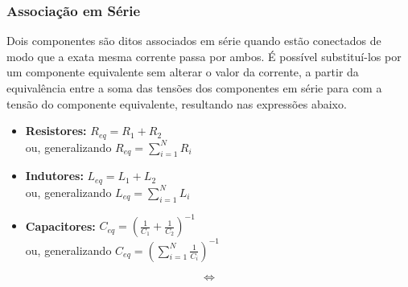\documentclass{article}
\numberwithin{equation}{section}
\newlength\Colsep
\begin{document}
\subsubsection{Associação em Série}
\label{subsubsec:serie}
Dois componentes são ditos associados em série quando estão conectados de modo que a exata mesma corrente passa por ambos. É possível substituí-los por um componente equivalente sem alterar o valor da corrente, a partir da equivalência entre a soma das tensões dos componentes em série para com a tensão do componente equivalente, resultando nas expressões abaixo.
\begin{itemize}
    \item \textbf{Resistores:} $R_{eq}= R_{1} + R_{2}$\\
    ou, generalizando $R_{eq}= \displaystyle{\sum_{i=1}^{N} R_{i}}$
    \item \textbf{Indutores:} $L_{eq}= L_{1} + L_{2}$\\
    ou, generalizando $L_{eq}= \displaystyle{\sum_{i=1}^{N} L_{i}}$
    \item \textbf{Capacitores:} $C_{eq}= \left(\displaystyle{\frac{1}{C_{1}}} + \displaystyle{\frac{1}{C_{2}}}\right)^{-1}$\\
    ou, generalizando $C_{eq}= \left(\displaystyle{\sum_{i=1}^{N} \frac{1}{C_{i}}}\right)^{-1}$
\end{itemize}

\noindent\begin{minipage}{\textwidth}
\begin{minipage}[c][2cm][c]{\dimexpr0.45\textwidth-0.5\Colsep\relax}
    \begin{center}
    \end{center}
\end{minipage} \hfill
\begin{minipage}[c][2cm][c]{\dimexpr0.1\textwidth-0.5\Colsep\relax}
    $$\iff$$
\end{minipage} \hfill
\begin{minipage}[c][2cm][c]{\dimexpr0.45\textwidth-0.5\Colsep\relax}
    \begin{center}
    \end{center}
\end{minipage}
\end{minipage}
\end{document}
